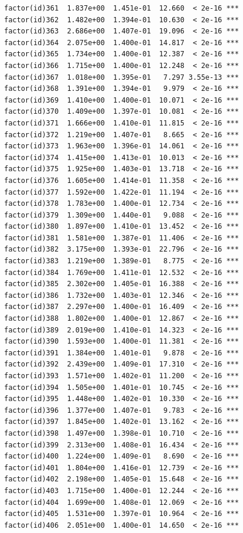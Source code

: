 \documentclass[]{book}
\begin{document}
\begin{verbatim}
factor(id)361  1.837e+00  1.451e-01  12.660  < 2e-16 ***
factor(id)362  1.482e+00  1.394e-01  10.630  < 2e-16 ***
factor(id)363  2.686e+00  1.407e-01  19.096  < 2e-16 ***
factor(id)364  2.075e+00  1.400e-01  14.817  < 2e-16 ***
factor(id)365  1.734e+00  1.400e-01  12.387  < 2e-16 ***
factor(id)366  1.715e+00  1.400e-01  12.248  < 2e-16 ***
factor(id)367  1.018e+00  1.395e-01   7.297 3.55e-13 ***
factor(id)368  1.391e+00  1.394e-01   9.979  < 2e-16 ***
factor(id)369  1.410e+00  1.400e-01  10.071  < 2e-16 ***
factor(id)370  1.409e+00  1.397e-01  10.081  < 2e-16 ***
factor(id)371  1.666e+00  1.410e-01  11.815  < 2e-16 ***
factor(id)372  1.219e+00  1.407e-01   8.665  < 2e-16 ***
factor(id)373  1.963e+00  1.396e-01  14.061  < 2e-16 ***
factor(id)374  1.415e+00  1.413e-01  10.013  < 2e-16 ***
factor(id)375  1.925e+00  1.403e-01  13.718  < 2e-16 ***
factor(id)376  1.605e+00  1.414e-01  11.358  < 2e-16 ***
factor(id)377  1.592e+00  1.422e-01  11.194  < 2e-16 ***
factor(id)378  1.783e+00  1.400e-01  12.734  < 2e-16 ***
factor(id)379  1.309e+00  1.440e-01   9.088  < 2e-16 ***
factor(id)380  1.897e+00  1.410e-01  13.452  < 2e-16 ***
factor(id)381  1.581e+00  1.387e-01  11.406  < 2e-16 ***
factor(id)382  3.175e+00  1.393e-01  22.796  < 2e-16 ***
factor(id)383  1.219e+00  1.389e-01   8.775  < 2e-16 ***
factor(id)384  1.769e+00  1.411e-01  12.532  < 2e-16 ***
factor(id)385  2.302e+00  1.405e-01  16.388  < 2e-16 ***
factor(id)386  1.732e+00  1.403e-01  12.346  < 2e-16 ***
factor(id)387  2.297e+00  1.400e-01  16.409  < 2e-16 ***
factor(id)388  1.802e+00  1.400e-01  12.867  < 2e-16 ***
factor(id)389  2.019e+00  1.410e-01  14.323  < 2e-16 ***
factor(id)390  1.593e+00  1.400e-01  11.381  < 2e-16 ***
factor(id)391  1.384e+00  1.401e-01   9.878  < 2e-16 ***
factor(id)392  2.439e+00  1.409e-01  17.310  < 2e-16 ***
factor(id)393  1.571e+00  1.402e-01  11.200  < 2e-16 ***
factor(id)394  1.505e+00  1.401e-01  10.745  < 2e-16 ***
factor(id)395  1.448e+00  1.402e-01  10.330  < 2e-16 ***
factor(id)396  1.377e+00  1.407e-01   9.783  < 2e-16 ***
factor(id)397  1.845e+00  1.402e-01  13.162  < 2e-16 ***
factor(id)398  1.497e+00  1.398e-01  10.710  < 2e-16 ***
factor(id)399  2.313e+00  1.408e-01  16.434  < 2e-16 ***
factor(id)400  1.224e+00  1.409e-01   8.690  < 2e-16 ***
factor(id)401  1.804e+00  1.416e-01  12.739  < 2e-16 ***
factor(id)402  2.198e+00  1.405e-01  15.648  < 2e-16 ***
factor(id)403  1.715e+00  1.400e-01  12.244  < 2e-16 ***
factor(id)404  1.699e+00  1.408e-01  12.069  < 2e-16 ***
factor(id)405  1.531e+00  1.397e-01  10.964  < 2e-16 ***
factor(id)406  2.051e+00  1.400e-01  14.650  < 2e-16 ***

\end{verbatim}
\end{document}
